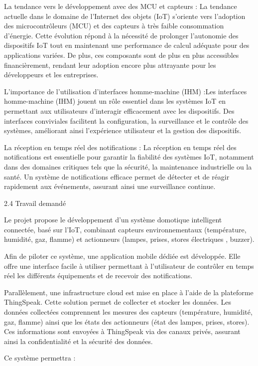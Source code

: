 \documentclass{article}
\begin{document}
La tendance vers le développement avec des MCU et capteurs : La tendance actuelle dans le domaine de l'Internet des objets (IoT) s'oriente vers l'adoption des microcontrôleurs (MCU) et des capteurs à très faible consommation d'énergie. Cette évolution répond à la nécessité de prolonger l'autonomie des dispositifs IoT tout en maintenant une performance de calcul adéquate pour des applications variées. De plus, ces composants sont de plus en plus accessibles financièrement, rendant leur adoption encore plus attrayante pour les développeurs et les entreprises.

L’importance de l'utilisation d'interfaces homme-machine (IHM) :Les interfaces homme-machine (IHM) jouent un rôle essentiel dans les systèmes IoT en permettant aux utilisateurs d'interagir efficacement avec les dispositifs. Des interfaces conviviales facilitent la configuration, la surveillance et le contrôle des systèmes, améliorant ainsi l'expérience utilisateur et la gestion des dispositifs.

La réception en temps réel des notifications : La réception en temps réel des notifications est essentielle pour garantir la fiabilité des systèmes IoT, notamment dans des domaines critiques tels que la sécurité, la maintenance industrielle ou la santé. Un système de notifications efficace permet de détecter et de réagir rapidement aux événements, assurant ainsi une surveillance continue.

2.4 Travail demandé

Le projet propose le développement d’un système domotique intelligent connectée, basé sur l’IoT, combinant capteurs environnementaux (température, humidité, gaz, flamme) et actionneurs (lampes, prises, stores électriques , buzzer).

Afin de piloter ce système, une application mobile dédiée est développée. Elle offre une interface facile à utiliser permettant à l’utilisateur de contrôler en temps réel les différents équipements et de recevoir des notifications.

Parallèlement, une infrastructure cloud est mise en place à l’aide de la plateforme ThingSpeak. Cette solution permet de collecter et stocker les données. Les données collectées comprennent les mesures des capteurs (température, humidité, gaz, flamme) ainsi que les états des actionneurs (état des lampes, prises, stores). Ces informations sont envoyées à ThingSpeak via des canaux privés, assurant ainsi la confidentialité et la sécurité des données.

Ce système permettra :
\end{document}
